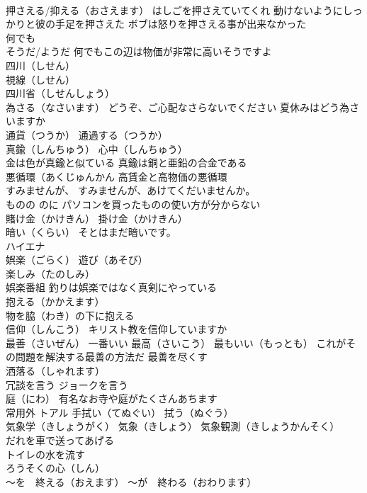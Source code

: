 \documentclass[8pt]{extreport}
\begin{document}
\begin{CJK}{UTF8}{min}
\\	押さえる/抑える（おさえます） はしごを押さえていてくれ 動けないようにしっかりと彼の手足を押さえた ボブは怒りを押さえる事が出来なかった
\\	何でも　
\\	そうだ/ようだ 何でもこの辺は物価が非常に高いそうですよ
\\	四川（しせん） 
\\	視線（しせん）
\\	四川省（しせんしょう）
\\	為さる（なさいます） どうぞ、ご心配なさらないでください 夏休みはどう為さいますか
\\	通貨（つうか） 通過する（つうか）　
\\	真鍮（しんちゅう） 心中（しんちゅう）
\\	金は色が真鍮と似ている 真鍮は銅と亜鉛の合金である
\\	悪循環（あくじゅんかん 高賃金と高物価の悪循環
\\	すみませんが、 すみませんが、あけてくだいませんか。
\\	ものの のに パソコンを買ったものの使い方が分からない
\\	賭け金（かけきん） 掛け金（かけきん） 
\\	暗い（くらい） そとはまだ暗いです。
\\	ハイエナ
\\	娯楽（ごらく） 遊び（あそび）
\\	楽しみ（たのしみ）
\\	娯楽番組 釣りは娯楽ではなく真剣にやっている
\\	抱える（かかえます） 
\\	物を脇（わき）の下に抱える
\\	信仰（しんこう） キリスト教を信仰していますか
\\	最善（さいぜん） 一番いい 最高（さいこう） 最もいい（もっとも） これがその問題を解決する最善の方法だ 最善を尽くす
\\	洒落る（しゃれます）
\\	冗談を言う ジョークを言う
\\	庭（にわ） 有名なお寺や庭がたくさんあちます
\\	常用外	トアル 手拭い（てぬぐい） 拭う（ぬぐう）
\\	気象学（きしょうがく） 気象（きしょう） 気象観測（きしょうかんそく）
\\	だれを車で送ってあげる
\\	トイレの水を流す
\\	ろうそくの心（しん）
\\	～を　終える（おえます） ～が　終わる（おわります）

\end{CJK}
\end{document}
